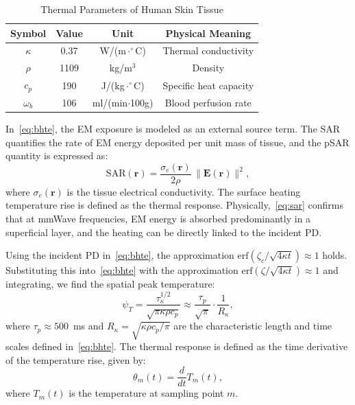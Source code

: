 \documentclass[journal]{IEEEtran}
\begin{document}
\begin{table}[t]
\centering
\caption{Thermal Parameters of Human Skin Tissue}
\label{tab:thermal}
\begin{tabular}{cccc}
\toprule
Symbol & Value & Unit & Physical Meaning \\
\midrule
$\kappa$ & 0.37 & W/(m$\cdot^\circ$C) & Thermal conductivity \\
$\rho$   & 1109 & kg/m$^3$ & Density \\
$c_p$    & 190  & J/(kg$\cdot^\circ$C) & Specific heat capacity \\
$\omega_b$ & 106  & ml/(min$\cdot$100g) & Blood perfusion rate \\
\bottomrule
\end{tabular}
\end{table}

In~\eqref{eq:bhte}, the EM exposure is modeled as an external source term. The SAR quantifies the rate of EM energy deposited per unit mass of tissue, and the pSAR quantity is expressed as:
\begin{equation}
    \mathrm{SAR}(\mathbf{r}) = \frac{\sigma_e(\mathbf{r})}{2\rho}\,\|\mathbf{E}(\mathbf{r})\|^2,
    \label{eq:sar}
\end{equation}
where $\sigma_e(\mathbf{r})$ is the tissue electrical conductivity. The surface heating temperature rise is defined as the thermal response. Physically,~\eqref{eq:sar} confirms that at mmWave frequencies, EM energy is absorbed predominantly in a superficial layer, and the heating can be directly linked to the incident PD.

Using the incident PD in~\eqref{eq:bhte}, the approximation $\mathrm{erf}(\zeta_c/\sqrt{4\kappa t}) \approx 1$ holds. Substituting this into~\eqref{eq:bhte} with the approximation $\mathrm{erf}(\zeta/\sqrt{4\kappa t}) \approx 1$ and integrating, we find the spatial peak temperature:
\begin{equation}
    \psi_T = \frac{\tau_{\kappa}^{1/2}}{\sqrt{\pi \kappa \rho c_p}} \approx \frac{\tau_p}{\sqrt{\pi}}\cdot\frac{1}{R_{\kappa}},
    \label{eq:psiT}
\end{equation}
where $\tau_p \approx 500$~ms and $R_{\kappa} = \sqrt{\kappa \rho c_p / \pi}$ are the characteristic length and time scales defined in~\eqref{eq:bhte}. The thermal response is defined as the time derivative of the temperature rise, given by:
\begin{equation}
    \theta_m(t) = \frac{d}{dt}T_m(t),
\end{equation}
where $T_m(t)$ is the temperature at sampling point $m$.
\end{document}
